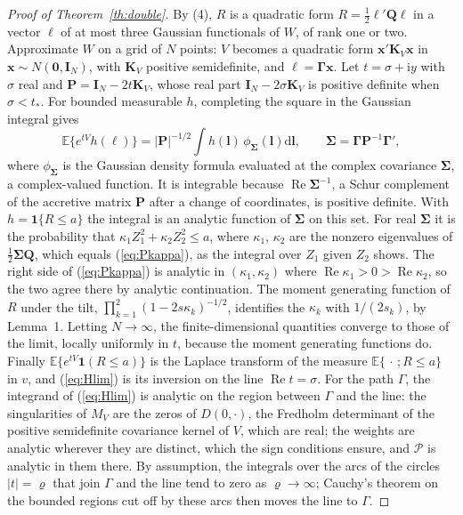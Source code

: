 \documentclass[ecta,nameyear,final,supplement]{econsocart}
\newcommand{\E}{{\mathbb E}}
\newcommand{\dr}[1]{{\mathrm d}#1}
\newcommand{\iu}{{\mathrm i}}
\newcommand{\Rea}{\operatorname{Re}}
\newcommand{\cP}{\mathcal{P}}
\newcommand{\bI}{\boldsymbol{I}}
\newcommand{\bSig}{\boldsymbol{\Sigma}}
\newcommand{\bP}{\boldsymbol{P}}
\theoremstyle{plain}
\theoremstyle{definition}
\begin{document}
\begin{proof}[Proof of Theorem~\ref{th:double}]
By (4), $R$ is a quadratic form $R=\frac12\bm\ell'\bm Q\bm\ell$ in a vector $\bm\ell$ of at most three Gaussian functionals of $W$, of rank one or two.  Approximate $W$ on a grid of $N$ points: $V$ becomes a quadratic form $\bm x'\bm K_V\bm x$ in $\bm x\sim N(\bm0,\bI_N)$, with $\bm K_V$ positive semidefinite, and $\bm\ell=\bm\Gamma\bm x$.  Let $t=\sigma+\iu y$ with $\sigma$ real and $\bP=\bI_N-2t\bm K_V$, whose real part $\bI_N-2\sigma\bm K_V$ is positive definite when $\sigma<t_*$.  For bounded measurable $h$, completing the square in the Gaussian integral gives
\[
\E\big\{e^{tV}h(\bm\ell)\big\}=|\bP|^{-1/2}\int h(\bm l)\,\phi_{\bSig}(\bm l)\dr{\bm l},\qquad\bSig=\bm\Gamma\bP^{-1}\bm\Gamma',
\]
where $\phi_{\bSig}$ is the Gaussian density formula evaluated at the complex covariance $\bSig$, a complex-valued function.  It is integrable because $\Rea\bSig^{-1}$, a Schur complement of the accretive matrix $\bP$ after a change of coordinates, is positive definite.  With $h=\mathbf{1}\{R\le a\}$ the integral is an analytic function of $\bSig$ on this set.  For real $\bSig$ it is the probability that $\kappa_1Z_1^2+\kappa_2Z_2^2\le a$, where $\kappa_1$, $\kappa_2$ are the nonzero eigenvalues of $\frac12\bSig\bm Q$, which equals (\ref{eq:Pkappa}), as the integral over $Z_1$ given $Z_2$ shows.  The right side of (\ref{eq:Pkappa}) is analytic in $(\kappa_1,\kappa_2)$ where $\Rea\kappa_1>0>\Rea\kappa_2$, so the two agree there by analytic continuation.  The moment generating function of $R$ under the tilt, $\prod_{k=1}^2(1-2s\kappa_k)^{-1/2}$, identifies the $\kappa_k$ with $1/(2s_k)$, by Lemma~1.  Letting $N\to\infty$, the finite-dimensional quantities converge to those of the limit, locally uniformly in $t$, because the moment generating functions do.  Finally $\E\{e^{tV}\mathbf{1}(R\le a)\}$ is the Laplace transform of the measure $\E\{\,\cdot\,;R\le a\}$ in $v$, and (\ref{eq:Hlim}) is its inversion on the line $\Rea t=\sigma$.  For the path $\Gamma$, the integrand of (\ref{eq:Hlim}) is analytic on the region between $\Gamma$ and the line: the singularities of $M_V$ are the zeros of $D(0,\cdot)$, the Fredholm determinant of the positive semidefinite covariance kernel of $V$, which are real; the weights are analytic wherever they are distinct, which the sign conditions ensure, and $\cP$ is analytic in them there.  By assumption, the integrals over the arcs of the circles $|t|=\varrho$ that join $\Gamma$ and the line tend to zero as $\varrho\to\infty$; Cauchy's theorem on the bounded regions cut off by these arcs then moves the line to $\Gamma$.


\end{proof}
\end{document}
